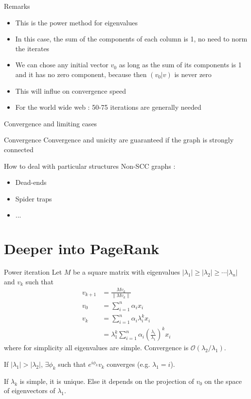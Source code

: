 \documentclass[10pt]{beamer}
\newcommand\bigoh{\mathcal{O}}
\begin{document}
\begin{frame}{Remarks}
\begin{itemize}
\item This is the power method for eigenvalues
\item In this case, the sum of the components of each column is 1, no need to norm the iterates
\item We can chose any initial vector $v_0$ as long as the sum of its components is 1 and it has no zero component, because then $(v_0|v)$ is never zero
\item This will influe on convergence speed
\item For the world wide web : 50-75 iterations are generally needed
\end{itemize}
\end{frame}

\begin{frame}{Convergence and limiting cases}
\begin{block}{Convergence}
Convergence and unicity are guaranteed if the graph is strongly connected
\end{block}
\begin{block}{How to deal with particular structures}
Non-SCC graphs :
\begin{itemize}
\item Dead-ends
\item Spider traps
\item ...
\end{itemize}
\end{block}
\end{frame}

\section{Deeper into PageRank}
\begin{frame}
  \tableofcontents[currentsection]
\end{frame}
\begin{frame}{Power iteration}
  Let $M$ be a square matrix with eigenvalues $|\lambda_1| \geq |\lambda_2| \geq \cdots |\lambda_n|$ and
  $v_k$ such that
  \begin{align*}
    v_{k+1} & = \frac{Mv_k}{\|Mv_k\|}\\
    v_0 & = \sum_{i=1}^n \alpha_i x_i\\
    v_k & = \sum_{i=1}^n \alpha_i \lambda_i^k x_i\\
        & = \lambda_1^k \sum_{i=1}^n \alpha_i \left(\frac{\lambda_i}{\lambda_1}\right)^k x_i
  \end{align*}
  where for simplicity all eigenvalues are simple.
  Convergence is $\bigoh(\lambda_2/\lambda_1)$.


  If $|\lambda_1| > |\lambda_2|$, $\exists \phi_k$ such that $e^{i\phi_k}v_k$ converges (e.g. $\lambda_1 = i$).

  If $\lambda_k$ is simple, it is unique.
  Else it depends on the projection of $v_0$ on the space of eigenvectors of $\lambda_1$.
\end{frame}
\end{document}
